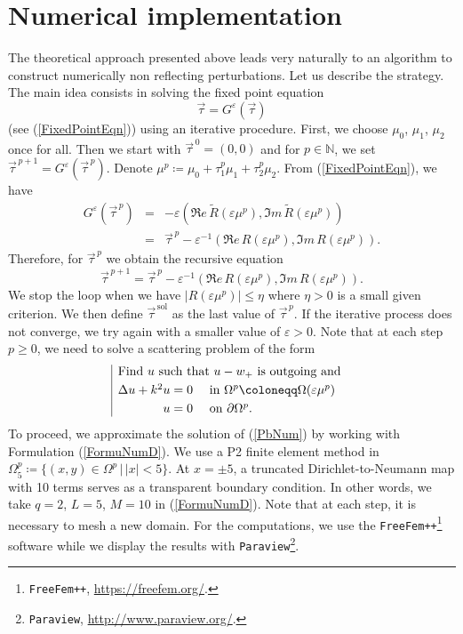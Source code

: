 \documentclass[11pt,a4paper]{report}
\newcommand{\eps}{\varepsilon}
\newcommand{\Om}{\Omega}
\newcommand{\mrm}[1]{\mathrm{#1}}
\newcommand{\N}{\mathbb{N}}
\begin{document}
\section{Numerical implementation}
The theoretical approach presented above leads very naturally to an algorithm to construct numerically non reflecting perturbations. Let us describe the strategy.\\
\newline
The main idea consists in solving the fixed point equation
\[
\vec{\tau}=G^\eps(\vec{\tau})
\]
(see (\ref{FixedPointEqn})) using an iterative procedure. First, we choose $\mu_0$, $\mu_1$, $\mu_2$ once for all. Then we start with $\vec{\tau}^{\,0}=(0,0)$ and for $p\in\N$, we set $\vec{\tau}^{\,p+1}=G^\eps(\vec{\tau}^{\,p})$. Denote $\mu^p\coloneqq\mu_0+\tau_1^p\mu_1+\tau_2^p\mu_2$. From (\ref{FixedPointEqn}), we have
\[
\begin{array}{rcl}
G^\eps(\vec{\tau}^{\,p})&=&-\eps(\Re e\,\tilde{R}(\eps\mu^p),\Im m\,\tilde{R}(\eps\mu^p)) \\[4pt]
&=& \vec{\tau}^{\,p}-\eps^{-1}(\Re e\,R(\eps\mu^p),\Im m\,R(\eps\mu^p)).
\end{array}
\]
Therefore, for $\vec{\tau}^{\,p}$ we obtain the recursive equation
\begin{equation}\label{IterativeProc}
\vec{\tau}^{\,p+1}=\vec{\tau}^{\,p}-\eps^{-1}(\Re e\,R(\eps\mu^p),\Im m\,R(\eps\mu^p)).
\end{equation}
We stop the loop when we have $|R(\eps\mu^p)| \le \eta$ where $\eta>0$ is a small given criterion. We then define $\vec{\tau}^{\,\mrm{sol}}$ as the last value of $\vec{\tau}^{\,p}$. If the iterative process does not converge, we try again with a smaller value of $\eps>0$. Note that at each step $p\ge0$, we need to solve a scattering problem of the form
\begin{equation}\label{PbNum}
\begin{array}{|rl}
\multicolumn{2}{|l}{\mbox{Find }u\mbox{ such that }u-w_+\mbox{ is outgoing and } }\\[3pt]
\Delta u + k^2 u = 0 & \mbox{ in }\Om^p\coloneqq\Om(\eps\mu^p) \\[3pt]
 u=0 & \mbox{ on }\partial\Om^p.
\end{array}
\end{equation}
To proceed, we approximate the solution of (\ref{PbNum})
by working with Formulation (\ref{FormuNumD}). We use a P2 finite element method in $\Om^p_5\coloneqq\{(x,y)\in\Om^p\,|\,|x|<5\}$. At $x=\pm 5$, a truncated Dirichlet-to-Neumann map with 10 terms serves as a transparent boundary condition. In other words, we take $q=2$, $L=5$, $M=10$ in (\ref{FormuNumD}). Note that at each step, it is necessary to mesh a new domain. For the computations, we use the \texttt{FreeFem++}\footnote{\texttt{FreeFem++}, \url{https://freefem.org/}.} software while we display the results with \texttt{Paraview}\footnote{\texttt{Paraview}, \url{http://www.paraview.org/}.}.
\end{document}
